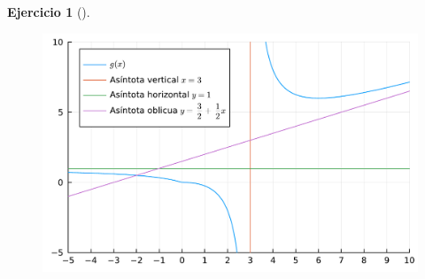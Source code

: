 \documentclass[
  a4paper,
]{scrreport}
\theoremstyle{definition}
\newtheorem{exercise}{Ejercicio}[chapter]
\theoremstyle{remark}
\begin{document}
\begin{exercise}[]
\begin{tcolorbox}
\begin{figure}[H]

{\centering \includegraphics{./limites_files/figure-pdf/cell-31-output-1.pdf}

}

\end{figure}

\end{tcolorbox}

\end{exercise}
\end{document}
